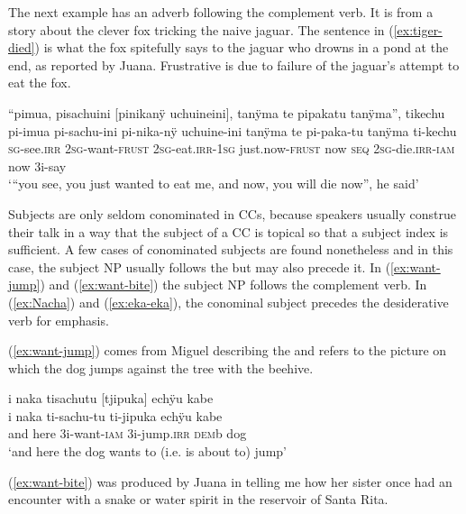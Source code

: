 The next example has an adverb following the complement verb. It is from a story about the clever fox tricking the naive jaguar. The sentence in (\ref{ex:tiger-died}) is what the fox spitefully says to the jaguar who drowns in a pond at the end, as reported by Juana. Frustrative is due to failure of the jaguar’s attempt to eat the fox.

\ea\label{ex:tiger-died}
\begingl
\glpreamble “pimua, pisachuini \textup{[}pinikanÿ uchuineini\textup{]}, tanÿma te pipakatu tanÿma”, tikechu\\
\gla pi-imua pi-sachu-ini pi-nika-nÿ uchuine-ini tanÿma te pi-paka-tu tanÿma ti-kechu\\
\textsc{sg}-see.\textsc{irr} 2\textsc{sg}-want-\textsc{frust} 2\textsc{sg}-eat.\textsc{irr}-1\textsc{sg} just.now-\textsc{frust} now \textsc{seq} 2\textsc{sg}-die.\textsc{irr}-\textsc{iam} now 3i-say\\
\glft ‘“you see, you just wanted to eat me, and now, you will die now”, he said’
\endgl
\trailingcitation{[jmx-n120429ls-x5.279]}
\xe


Subjects are only seldom conominated in CCs, because speakers usually construe their talk in a way that the subject of a CC is topical so that a subject index is sufficient. A few cases of conominated subjects are found nonetheless and in this case, the subject NP usually follows the  but may also precede it. In (\ref{ex:want-jump}) and (\ref{ex:want-bite}) the subject NP follows the complement verb. In (\ref{ex:Nacha}) and (\ref{ex:eka-eka}), the conominal subject precedes the desiderative verb for emphasis.

(\ref{ex:want-jump}) comes from Miguel describing the  and refers to the picture on which the dog jumps against the tree with the beehive.

\ea\label{ex:want-jump}
\begingl
\glpreamble i naka tisachutu \textup{[}tjipuka\textup{]} echÿu kabe\\
\gla i naka ti-sachu-tu ti-jipuka echÿu kabe\\
\glb and here 3i-want-\textsc{iam} 3i-jump.\textsc{irr} \textsc{dem}b dog\\
\glft ‘and here the dog wants to (i.e. is about to) jump’
\endgl
\trailingcitation{[mtx-a110906l.091]}
\xe

(\ref{ex:want-bite}) was produced by Juana in telling me how her sister once had an encounter with a snake or water spirit in the reservoir of Santa Rita.

